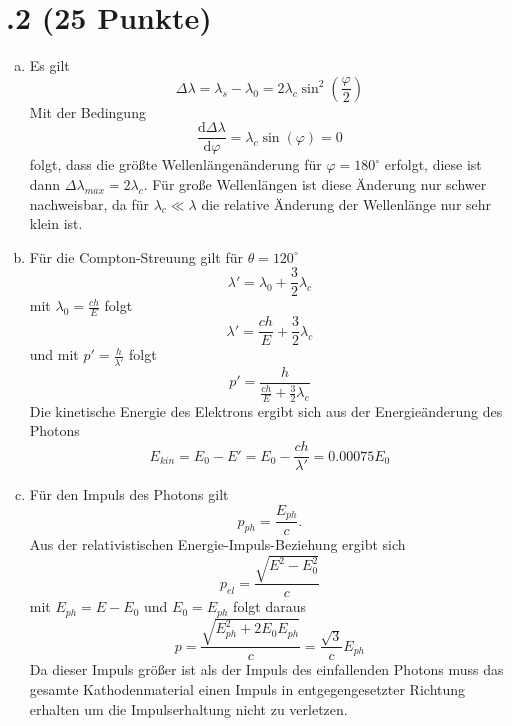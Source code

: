 \section*{\nr.2 \tittwo (25 Punkte)}
\begin{enumerate}[(a)]
\item Es gilt
\begin{equation}
  \Delta \lambda=\lambda_s-\lambda_0 =2\lambda_c\sin^2\left(\frac{\varphi}{2}\right)
\end{equation}
Mit der Bedingung 
\begin{equation}
  \frac{\mathrm{d}\Delta\lambda}{\mathrm{d}\varphi}=\lambda_c\sin(\varphi)=0
\end{equation}
folgt, dass die größte Wellenlängenänderung für $\varphi=180^{\circ}$ erfolgt, diese ist dann $\Delta \lambda_{max}=2\lambda_c$.
Für große Wellenlängen ist diese Änderung nur schwer nachweisbar, da für $\lambda_c\ll\lambda$ die relative Änderung der Wellenlänge nur sehr klein ist.
\item Für die Compton-Streuung gilt für $\theta=120^{\circ}$
\begin{equation}
  \lambda'=\lambda_0+\frac{3}{2}\lambda_c
\end{equation}
mit $\lambda_0=\frac{ch}{E}$ folgt
\begin{equation}
  \lambda'=\frac{ch}{E}+\frac{3}{2}\lambda_c
\end{equation}
und mit $p'=\frac{h}{\lambda'}$ folgt
\begin{equation}
  p'=\frac{h}{\frac{ch}{E}+\frac{3}{2}\lambda_c}
\end{equation}
Die kinetische Energie des Elektrons ergibt sich aus der Energieänderung des Photons
\begin{equation}
  E_{kin}=E_0-E'=E_0- \frac{ch}{\lambda'}=0.00075E_0
\end{equation}
\item Für den Impuls des Photons gilt
\begin{equation}
  p_{ph}=\frac{E_{ph}}{c}.
\end{equation}
Aus der relativistischen Energie-Impuls-Beziehung ergibt sich
\begin{equation}
  p_{el}=\frac{\sqrt{E^2-E_0^2}}{c}
\end{equation}
mit $E_{ph}=E-E_0$ und $E_0=E_{ph}$ folgt daraus
\begin{equation}
  p=\frac{\sqrt{E_{ph}^2+2E_0E_{ph}}}{c}=\frac{\sqrt{3}}{c}E_{ph}
\end{equation}
Da dieser Impuls größer ist als der Impuls des einfallenden Photons muss das gesamte Kathodenmaterial einen Impuls in entgegengesetzter Richtung erhalten um die Impulserhaltung nicht zu verletzen.
\end{enumerate}